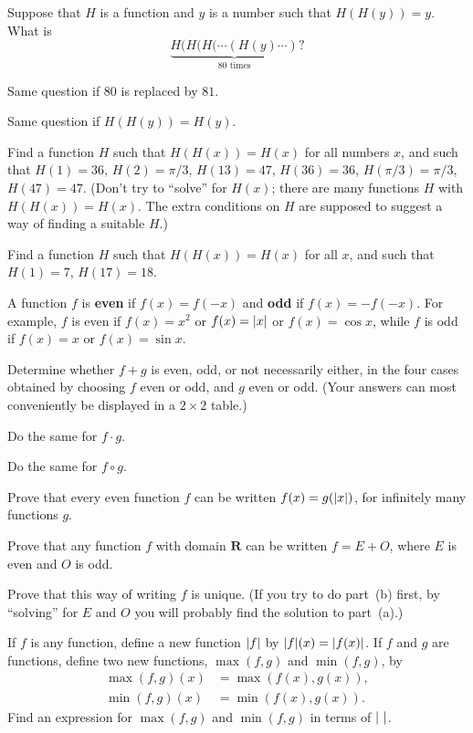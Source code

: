 \begin{letters}
\item Suppose that $H$ is a function and $y$ is a number such that
$H(H(y))=y$. What is
\[
\underbrace{H(H(H(\cdots(H(y)\cdots)}_{80\text{ times}}?
\]
\item Same question if $80$ is replaced by $81$.
\item Same question if $H(H(y))=H(y)$.
\item[*(d)] Find a function $H$ such that $H(H(x))=H(x)$ for all numbers $x$,
and such that $H(1)=36$, $H(2)=\pi/3$, $H(13)=47$, $H(36)=36$,
$H(\pi/3)=\pi/3$, $H(47)=47$. (Don't try to ``solve'' for $H(x)$; there are
many functions $H$ with $H(H(x))=H(x)$. The extra conditions on $H$ are
supposed to suggest a way of finding a suitable $H$.)
\item[*(e)] Find a function $H$ such that $H(H(x))=H(x)$ for all $x$, and such
that $H(1)=7$, $H(17)=18$.
\end{letters}

 A function $f$ is \textbf{even} if $f(x)=f(-x)$ and \textbf{odd} if
$f(x)=-f(-x)$. For example, $f$ is even if $f(x)=x^2$ or $f(x)=\lvert x\rvert$ or
$f(x)=\cos x$, while $f$ is odd if $f(x)=x$ or $f(x)=\sin x$.
\begin{letters}
\item Determine whether $f+g$ is even, odd, or not necessarily either, in the
four cases obtained by choosing $f$ even or odd, and $g$ even or odd. (Your
answers can most conveniently be displayed in a $2 \times 2$ table.)
\item Do the same for $f \cdot g$.
\item Do the same for $f \circ g$.
\item Prove that every even function $f$ can be written $f(x)=g(\lvert x\rvert)$, for
infinitely many functions $g$.
\end{letters}

\begin{letters}
\item Prove that any function $f$ with domain $\mathbf{R}$ can be written
$f = E + O$, where $E$ is even and $O$ is odd.
\item Prove that this way of writing $f$ is unique. (If you try to do
part~(b) first, by ``solving'' for $E$ and $O$ you will probably find the
solution to part~(a).)
\end{letters}

 If $f$ is any function, define a new function $\lvert f\rvert$ by
$\lvert f\rvert(x)=\lvert f(x)\rvert$. If $f$ and $g$ are functions, define two new
functions, $\max(f,g)$ and $\min(f,g)$, by
\begin{align*}
\max(f,g)(x) &= \max(f(x), g(x)),\\
\min(f,g)(x) &= \min(f(x), g(x)).
\end{align*}
Find an expression for $\max(f,g)$ and $\min(f,g)$ in terms of $\lvert\ \rvert$.

